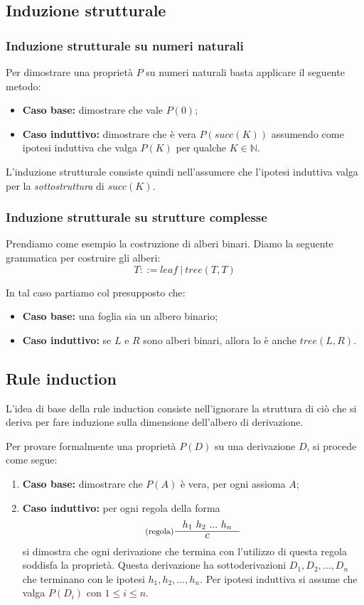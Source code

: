 \documentclass[a4paper, 11pt]{article}
\begin{document}
\subsection{Induzione strutturale}
\subsubsection{Induzione strutturale su numeri naturali}
Per dimostrare una proprietà $P$ su numeri naturali basta applicare il seguente metodo: \begin{itemize}
	\item \textbf{Caso base:} dimostrare che vale $P(0)$;
	\item \textbf{Caso induttivo:} dimostrare che è vera $P(succ(K))$ assumendo come ipotesi induttiva che valga $P(K)$ per qualche $K \in \mathbb{N}$.
\end{itemize}

L'induzione strutturale consiste quindi nell'assumere che l'ipotesi induttiva valga per la \textit{sottostruttura} di $succ(K)$.

\subsubsection{Induzione strutturale su strutture complesse}
Prendiamo come esempio la costruzione di alberi binari. Diamo la seguente grammatica per costruire gli alberi: \[ T::= leaf\ |\ tree(T,T) \]

In tal caso partiamo col presupposto che: \begin{itemize}
		\item \textbf{Caso base:} una foglia sia un albero binario;
		\item \textbf{Caso induttivo:} se $L$ e $R$ sono alberi binari, allora lo è anche $tree(L,R)$.
\end{itemize}

\subsection{Rule induction}
L'idea di base della rule induction consiste nell'ignorare la struttura di ciò che si deriva per fare induzione sulla dimensione dell'albero di derivazione.

Per provare formalmente una proprietà $P(D)$ su una derivazione $D$, si procede come segue: \begin{enumerate}
	\item \textbf{Caso base:} dimostrare che $P(A)$ è vera, per ogni assioma $A$;
	\item \textbf{Caso induttivo:} per ogni regola della forma \[ \inference[(regola)]{h_1\ h_2\ ...\ h_n}{c} \] si dimostra che ogni derivazione che termina con l'utilizzo di questa regola soddisfa la proprietà. Questa derivazione ha sottoderivazioni $D_1, D_2,...,D_n$ che terminano con le ipotesi $h_1, h_2,...,h_n$. Per ipotesi induttiva si assume che valga $P(D_i)$ con $1\leq i \leq n$.
	
\end{enumerate}
\end{document}
